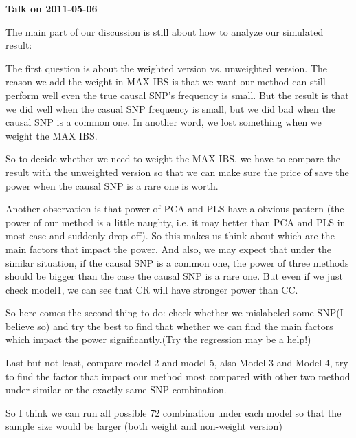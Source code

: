 \documentclass{article}
\begin{document}
    \begin{center}
        {\bf Talk on 2011-05-06}
    \end{center}
 
    The main part of our discussion is still about how to analyze our simulated result:
    
    The first question is about the weighted version vs. unweighted version. The reason we add the weight in MAX IBS is that we want our method can still perform well even the true causal SNP's frequency is small. But the result is that we did well when the casual SNP frequency is small, but we did bad when the causal SNP is a common one. In another word, we lost something when we weight the MAX IBS.
    
    So to decide whether we need to weight the MAX IBS, we have to compare the result with the unweighted version so that we can make sure the price of save the power when the causal SNP is a rare one is worth.
    
    Another observation is that power of PCA and PLS have a obvious pattern (the power of our method is a little naughty, i.e. it may better than PCA and PLS in most case and suddenly drop off). So this makes us think about which are the main factors that impact the power. And also, we may expect that under the similar situation, if the causal SNP is a common one, the power of three methods should be bigger than the case the causal SNP is a rare one. But even if we just check model1, we can see that CR will have stronger power than CC.
    
    So here comes the second thing to do: check whether we mislabeled some SNP(I believe so) and try the best to find that whether we can find the main factors which impact the power significantly.(Try the regression may be a help!)
    
    Last but not least, compare model 2 and model 5, also Model 3 and Model 4, try to find the factor that impact our method most compared with other two method under similar or the exactly same SNP combination.
    
    So I think we can run all possible 72 combination under each model so that the sample size would be larger (both weight and non-weight version)
\end{document}
